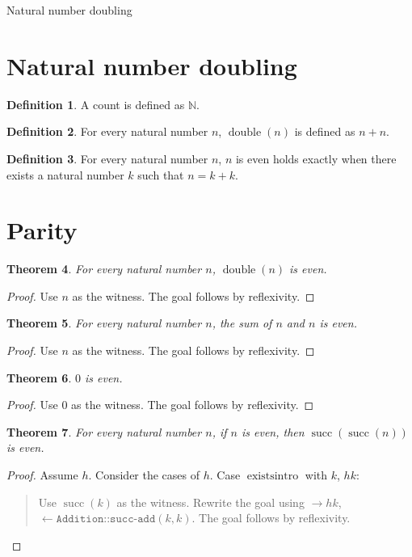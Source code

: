 \documentclass[11pt]{article}
\newtheorem{theorem}{Theorem}[section]
\theoremstyle{definition}
\newtheorem{definition}[theorem]{Definition}
\begin{document}
\begin{center}
{\LARGE Natural number doubling}
\end{center}
\section{Natural number doubling}
\label{ll:doubling:definitions}
\begin{definition}
\label{ll:doubling:count}
A count is defined as \(\mathbb{N}\).
\end{definition}
\begin{definition}
\label{ll:doubling:double}
For every natural number \(n\), \(\operatorname{double}(n)\) is defined as \(n + n\).
\end{definition}
\begin{definition}
\label{ll:doubling:even}
For every natural number \(n\), \(n\) is even holds exactly when there exists a natural number \(k\) such that \(n = k + k\).
\end{definition}
\section{Parity}
\label{ll:doubling:parity}
\begin{theorem}
\label{ll:doubling:double-even}
For every natural number \(n\), \(\operatorname{double}(n)\) is even.
\end{theorem}
\begin{proof}
Use \(n\) as the witness.
The goal follows by reflexivity.
\end{proof}
\begin{theorem}
\label{ll:doubling:sum-even}
For every natural number \(n\), the sum of \(n\) and \(n\) is even.
\end{theorem}
\begin{proof}
Use \(n\) as the witness.
The goal follows by reflexivity.
\end{proof}
\begin{theorem}
\label{ll:doubling:zero-even}
\(0\) is even.
\end{theorem}
\begin{proof}
Use \(0\) as the witness.
The goal follows by reflexivity.
\end{proof}
\begin{theorem}
\label{ll:doubling:even-succ-succ}
For every natural number \(n\), if \(n\) is even, then \(\operatorname{succ}(\operatorname{succ}(n))\) is even.
\end{theorem}
\begin{proof}
Assume \(h\).
Consider the cases of \(h\).
Case \(\operatorname{existsintro}\) with \(k\), \(hk\):
\begin{quote}
Use \(\operatorname{succ}(k)\) as the witness.
Rewrite the goal using \(\rightarrow hk\), \(\leftarrow \texttt{Addition::succ-add}(k, k)\).
The goal follows by reflexivity.
\end{quote}
\end{proof}
\end{document}
